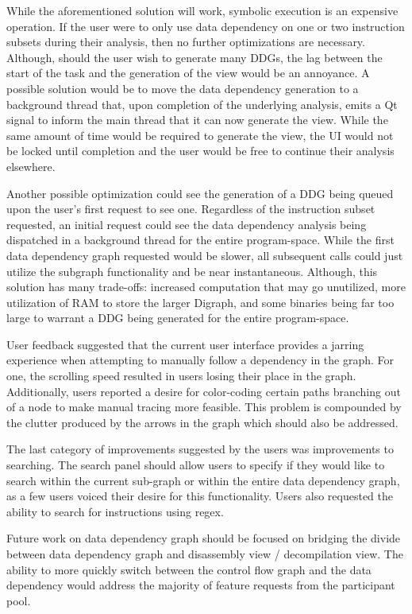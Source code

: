 While the aforementioned solution will work, symbolic execution is an expensive operation. If the user were to only use data dependency on one or two instruction subsets during their analysis, then no further optimizations are necessary. Although, should the user wish to generate many DDGs, the lag between the start of the task and the generation of the view would be an annoyance. A possible solution would be to move the data dependency generation to a background thread that, upon completion of the underlying analysis, emits a Qt signal to inform the main thread that it can now generate the view. While the same amount of time would be required to generate the view, the UI would not be locked until completion and the user would be free to continue their analysis elsewhere.  

Another possible optimization could see the generation of a DDG being queued upon the user’s first request to see one. Regardless of the instruction subset requested, an initial request could see the data dependency analysis being dispatched in a background thread for the entire program-space. While the first data dependency graph requested would be slower, all subsequent calls could just utilize the subgraph functionality and be near instantaneous. Although, this solution has many trade-offs: increased computation that may go unutilized, more utilization of RAM to store the larger Digraph, and some binaries being far too large to warrant a DDG being generated for the entire program-space.

User feedback suggested that the current user interface provides a jarring experience when attempting to manually follow a dependency in the graph. For one, the scrolling speed resulted in users losing their place in the graph. Additionally, users reported a desire for color-coding certain paths branching out of a node to make manual tracing more feasible. This problem is compounded by the clutter produced by the arrows in the graph which should also be addressed.

The last category of improvements suggested by the users was improvements to searching. The search panel should allow users to specify if they would like to search within the current sub-graph or within the entire data dependency graph, as a few users voiced their desire for this functionality. Users also requested the ability to search for instructions using regex. 

Future work on data dependency graph should be focused on bridging the divide between data dependency graph and disassembly view / decompilation view. The ability to more quickly switch between the control flow graph and the data dependency would address the majority of feature requests from the participant pool.


